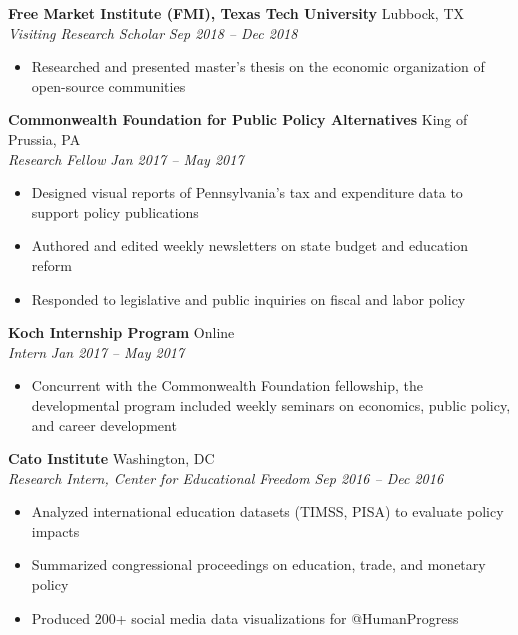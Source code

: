 \documentclass[a4paper,11pt]{article}
\begin{document}
\vspace{1mm}
\textbf{Free Market Institute (FMI), Texas Tech University} \hfill Lubbock, TX\\
\textit{Visiting Research Scholar} \hfill  \textit{Sep 2018 -- Dec 2018}
\begin{itemize}
\item Researched and presented master’s thesis on the economic organization of open-source communities
\end{itemize}

\vspace{1mm}
\textbf{Commonwealth Foundation for Public Policy Alternatives} \hfill King of Prussia, PA\\
\textit{Research Fellow} \hfill  \textit{Jan 2017 -- May 2017}
\begin{itemize}
\item Designed visual reports of Pennsylvania’s tax and expenditure data to support policy publications
\item Authored and edited weekly newsletters on state budget and education reform
\item Responded to legislative and public inquiries on fiscal and labor policy
\end{itemize}

\vspace{1mm}
\textbf{Koch Internship Program} \hfill Online\\
\textit{Intern} \hfill  \textit{Jan 2017 -- May 2017}
\begin{itemize}
\item Concurrent with the Commonwealth Foundation fellowship, the developmental program included weekly seminars on economics, public policy, and career development
\end{itemize}

\vspace{1mm}
\textbf{Cato Institute} \hfill Washington, DC\\
\textit{Research Intern, Center for Educational Freedom} \hfill \textit{Sep 2016 -- Dec 2016}
\begin{itemize}
\item Analyzed international education datasets (TIMSS, PISA) to evaluate policy impacts
\item Summarized congressional proceedings on education, trade, and monetary policy
\item Produced 200+ social media data visualizations for @HumanProgress
\end{itemize}
\end{document}

